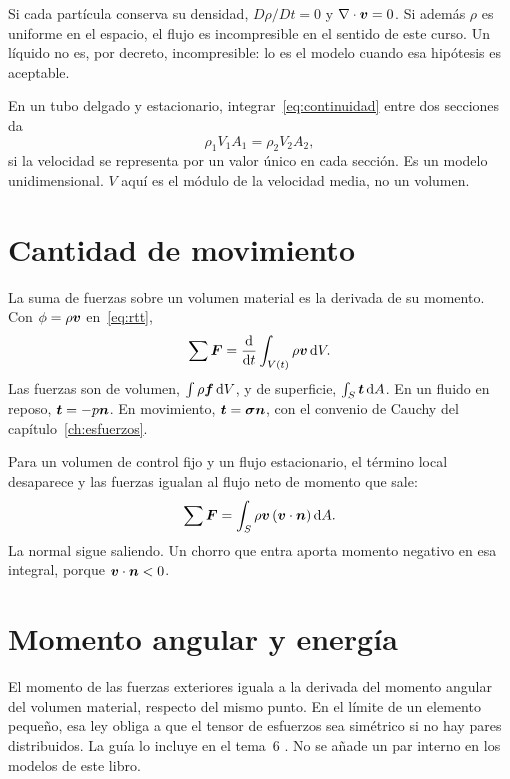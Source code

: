 Si cada partícula conserva su densidad, \(D\rho/Dt=0\) y \(\nabla\cdot\boldsymbol{v}=0\). Si además \(\rho\) es uniforme en el espacio, el flujo es incompresible en el sentido de este curso. Un líquido no es, por decreto, incompresible: lo es el modelo cuando esa hipótesis es aceptable.

En un tubo delgado y estacionario, integrar~\eqref{eq:continuidad} entre dos secciones da
\begin{equation}
\label{eq:caudal}
\rho_1 V_1 A_1=\rho_2 V_2 A_2,
\end{equation}
si la velocidad se representa por un valor único en cada sección. Es un modelo unidimensional. \(V\) aquí es el módulo de la velocidad media, no un volumen.

\section{Cantidad de movimiento}

La suma de fuerzas sobre un volumen material es la derivada de su momento. Con \(\phi=\rho\boldsymbol{v}\) en~\eqref{eq:rtt},
\begin{equation}
\label{eq:momento-integral}
\sum\boldsymbol{F}
=\frac{\mathrm{d}}{\mathrm{d}t}\int_{V(t)}\rho\boldsymbol{v}\,\mathrm{d}V.
\end{equation}
Las fuerzas son de volumen, \(\int\rho\boldsymbol{f}\,\mathrm{d}V\), y de superficie, \(\int_S\boldsymbol{t}\,\mathrm{d}A\). En un fluido en reposo, \(\boldsymbol{t}=-p\boldsymbol{n}\). En movimiento, \(\boldsymbol{t}=\boldsymbol{\sigma}\boldsymbol{n}\), con el convenio de Cauchy del capítulo~\ref{ch:esfuerzos}.

Para un volumen de control fijo y un flujo estacionario, el término local desaparece y las fuerzas igualan al flujo neto de momento que sale:
\begin{equation}
\label{eq:momento-vc}
\sum\boldsymbol{F}=\int_S\rho\boldsymbol{v}\,(\boldsymbol{v}\cdot\boldsymbol{n})\,\mathrm{d}A.
\end{equation}
La normal sigue saliendo. Un chorro que entra aporta momento negativo en esa integral, porque \(\boldsymbol{v}\cdot\boldsymbol{n}<0\).

\section{Momento angular y energía}

El momento de las fuerzas exteriores iguala a la derivada del momento angular del volumen material, respecto del mismo punto. En el límite de un elemento pequeño, esa ley obliga a que el tensor de esfuerzos sea simétrico si no hay pares distribuidos. La guía lo incluye en el tema~6 \parencite{uleGuia2026}. No se añade un par interno en los modelos de este libro.

